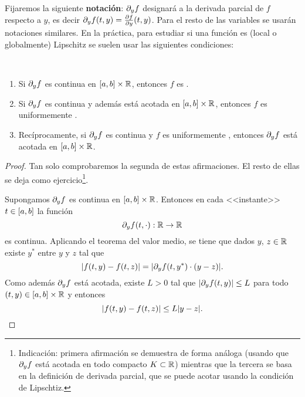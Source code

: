 Fijaremos la siguiente
\textbf{notación}: $\dy f$ designará a la derivada parcial de $f$
respecto a $y$, es decir $\dy f(\tt,y) = \frac{\partial f}{\partial
  \yy}(\tt,y)$. Para el resto de las variables se usarán notaciones
similares.
  En la práctica, para estudiar si una función es (local o
  globalmente) Lipschitz se suelen usar las siguientes condiciones:
  \begin{proposition}~
    \begin{enumerate}
    \item Si $\dy f$ es continua en $[\ta,\tb]\times\Rset$, entonces
      $f$ es \locLipschitz.
    \item Si $\dy f$ es continua y además está acotada en
      $[\ta,\tb]\times\Rset$, entonces $f$ es uniformemente
      \globLipschitz.
    \item Recíprocamente, si $\dy f$ es continua y $f$ es
      uniformemente \globLipschitz, entonces $\dy f$ está acotada en
      $[\ta,\tb]\times\Rset$.
    \end{enumerate}
  \end{proposition}
  \begin{proof}
    Tan solo comprobaremos la segunda de estas afirmaciones. El resto
    de ellas se deja como ejercicio\footnote{Indicación: primera
      afirmación se demuestra de forma análoga (usando que $\dy f$
      está acotada en todo compacto $K\subset\Rset$) mientras que la
      tercera se basa en la definición de derivada parcial, que se
      puede acotar usando la condición de Lipschtiz.}.

    Supongamos $\dy f$ es
    continua en $[\ta,\tb]\times\Rset$. Entonces en cada <<instante>>
    $t\in[\ta,\tb]$ la función
  $$\dy f(t,\cdot):\Rset \to \Rset$$
  es continua. Aplicando el teorema del valor medio, se tiene que
  dados $y$, $z\in\Rset$ existe $y^*$ entre $y$ y $z$ tal que
  \begin{equation*}
    |f(\tt,y)-f(\tt,z)| = |\dy f(\tt,y^*) \cdot (y-z)|.
  \end{equation*}
  Como además $\dy f$ está acotada, existe $L>0$ tal que
  $|\dy f(\tt,y)|\le L$ para todo $(\tt,y)\in [\ta,\tb]\times\Rset$ y
  entonces
  \begin{equation*}
    |f(\tt,y) - f(\tt,z)| \le L |y-z|.
  \end{equation*}
\end{proof}

